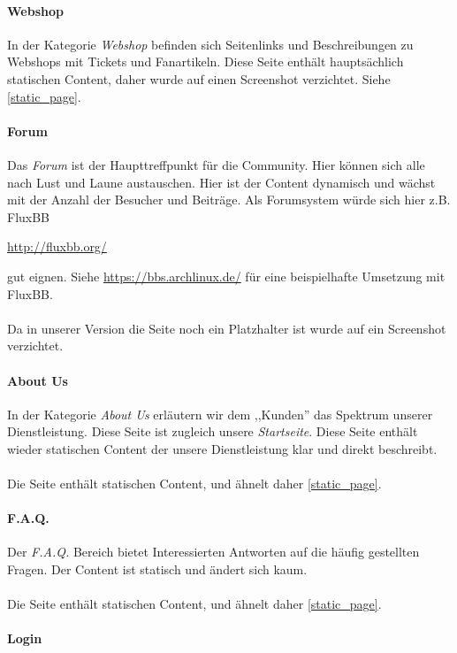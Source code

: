 \paragraph{Webshop}
In der Kategorie \emph{Webshop} befinden sich Seitenlinks und Beschreibungen zu
Webshops mit Tickets und Fanartikeln. Diese Seite enthält hauptsächlich
statischen Content, daher wurde auf einen Screenshot verzichtet. Siehe
\ref{static_page}.

\paragraph{Forum}
Das \emph{Forum} ist der Haupttreffpunkt für die Community. Hier können sich
alle nach Lust und Laune austauschen. Hier ist der Content dynamisch und wächst
mit der Anzahl der Besucher und Beiträge. Als Forumsystem würde sich hier
z.B. FluxBB 
\begin{center}
    \url{http://fluxbb.org/}
\end{center}
gut eignen. Siehe \url{https://bbs.archlinux.de/} für eine beispielhafte
Umsetzung mit FluxBB.
\\
\\
Da in unserer Version die Seite noch ein Platzhalter ist wurde auf ein Screenshot
verzichtet.


\paragraph{About Us}
In der Kategorie \emph{About Us} erläutern wir dem ,,Kunden'' das Spektrum unserer
Dienstleistung. Diese Seite ist zugleich unsere \emph{Startseite}. Diese Seite
enthält wieder statischen Content der unsere Dienstleistung klar und direkt
beschreibt.
\\
\\
Die Seite enthält statischen Content, und ähnelt daher \ref{static_page}.

\paragraph{F.A.Q.}
Der \emph{F.A.Q.} Bereich bietet Interessierten Antworten auf die häufig
gestellten Fragen. Der Content ist statisch und ändert sich kaum. 
\\
\\
Die Seite enthält statischen Content, und ähnelt daher \ref{static_page}.

\paragraph{Login}

